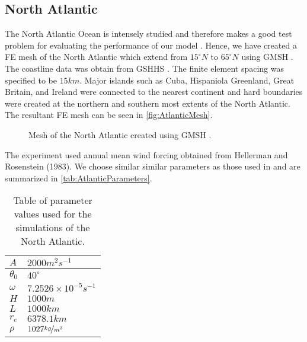 \subsection{North Atlantic}
The North Atlantic Ocean is intensely studied and therefore makes a good test
problem for evaluating the performance of our model \cite{Myers}. Hence, we have
created a FE mesh of the North Atlantic which extend from $15^\circ N$ to $65^\circ
N$ using GMSH \cite{GMSH}. The coastline data was obtain from GSHHS \cite{GSHHS}.
The finite element spacing was specified to be {\color{red} $15km$}.  Major
islands such as Cuba, Hispaniola Greenland, Great Britain, and Ireland were
connected to the nearest continent and hard boundaries were created at the
northern and southern most extents of the North Atlantic. The resultant FE mesh
can be seen in \autoref{fig:AtlanticMesh}.

\begin{figure}
  \caption{Mesh of the North Atlantic created using GMSH \cite{GMSH}.}
  \label{fig:AtlanticMesh}
\end{figure}

The experiment used annual mean wind forcing obtained from Hellerman and
Rosenstein (1983). We choose similar similar parameters as those used in
\cite{delSastre04} and are summarized in \autoref{tab:AtlanticParameters}.

\begin{table}
  \begin{center}
  \begin{tabular}{|l|l|}
    \hline
    $A$ & $2000m^2s^{-1}$\\
    \hline
    $\theta_0$ & $40^\circ$ \\
    \hline
    $\omega$ & $7.2526\times 10^{-5}s^{-1}$ \\
    \hline
    $H$ & $1000m$ \\
    \hline
    $L$ & $1000km$ \\
    \hline
    $r_e$ & $6378.1km$ \\
    \hline
    $\rho$ & $1027 \nicefrac{kg}{m^3}$ \\
    \hline
  \end{tabular}
  \end{center}
  \caption{Table of parameter values used for the simulations of the North
    Atlantic. \cite{delSastre04}}
  \label{tab:AtlanticParameters}
\end{table}

